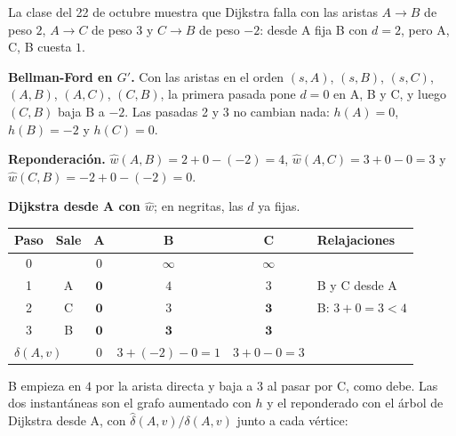 \documentclass[11pt,letterpaper]{article}
\begin{document}
\begin{ejemplo}
  \label{ej:johnson-libreta}
  La clase del 22 de octubre muestra que Dijkstra falla con las
  aristas $A \to B$ de peso $2$, $A \to C$ de peso $3$ y $C \to B$ de
  peso $-2$: desde A fija B con $d = 2$, pero A, C, B cuesta $1$.

  \textbf{Bellman-Ford en $G'$.} Con las aristas en el orden
  $(s, A)$, $(s, B)$, $(s, C)$, $(A, B)$, $(A, C)$, $(C, B)$, la
  primera pasada pone $d = 0$ en A, B y C, y luego $(C, B)$ baja B a
  $-2$. Las pasadas 2 y 3 no cambian nada: $h(A) = 0$, $h(B) = -2$ y
  $h(C) = 0$.

  \textbf{Reponderación.} $\hat{w}(A, B) = 2 + 0 - (-2) = 4$,
  $\hat{w}(A, C) = 3 + 0 - 0 = 3$ y
  $\hat{w}(C, B) = -2 + 0 - (-2) = 0$.

  \textbf{Dijkstra desde A con $\hat{w}$}; en negritas, las $d$ ya
  fijas.
  \begin{center}
  \small
  \begin{tabular}{cccccl}
    \toprule
    \textbf{Paso} & \textbf{Sale} & A & B & C
      & \textbf{Relajaciones} \\
    \midrule
    0 & & $0$ & $\infty$ & $\infty$ & \\
    1 & A & $\mathbf{0}$ & $4$ & $3$ & B y C desde A \\
    2 & C & $\mathbf{0}$ & $3$ & $\mathbf{3}$ & B: $3 + 0 = 3 < 4$ \\
    3 & B & $\mathbf{0}$ & $\mathbf{3}$ & $\mathbf{3}$ & \\
    \midrule
    \multicolumn{2}{l}{$\delta(A, v)$} & $0$ & $3 + (-2) - 0 = 1$
      & $3 + 0 - 0 = 3$ & \\
    \bottomrule
  \end{tabular}
  \end{center}
  B empieza en $4$ por la arista directa y baja a $3$ al pasar por C,
  como debe. Las dos instantáneas son el grafo aumentado con $h$ y el
  reponderado con el árbol de Dijkstra desde A, con
  $\hat{\delta}(A, v) / \delta(A, v)$ junto a cada vértice:
  \begin{center}
\end{center}
\end{ejemplo}
\end{document}
